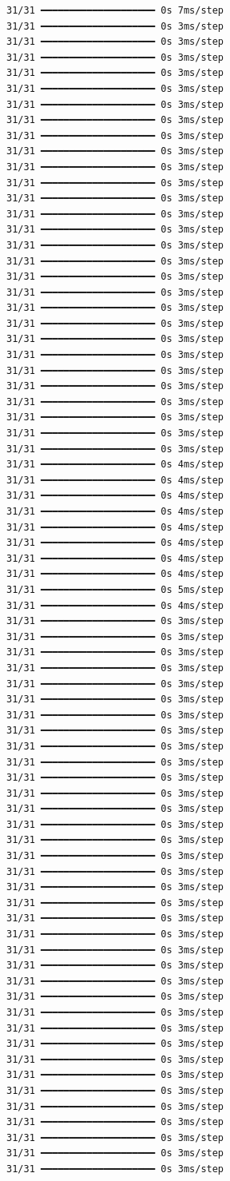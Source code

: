 \documentclass[
  letterpaper,
  DIV=11,
  numbers=noendperiod]{scrreprt}
\begin{document}
\begin{verbatim}
31/31 ━━━━━━━━━━━━━━━━━━━━ 0s 7ms/step
31/31 ━━━━━━━━━━━━━━━━━━━━ 0s 3ms/step
31/31 ━━━━━━━━━━━━━━━━━━━━ 0s 3ms/step
31/31 ━━━━━━━━━━━━━━━━━━━━ 0s 3ms/step
31/31 ━━━━━━━━━━━━━━━━━━━━ 0s 3ms/step
31/31 ━━━━━━━━━━━━━━━━━━━━ 0s 3ms/step
31/31 ━━━━━━━━━━━━━━━━━━━━ 0s 3ms/step
31/31 ━━━━━━━━━━━━━━━━━━━━ 0s 3ms/step
31/31 ━━━━━━━━━━━━━━━━━━━━ 0s 3ms/step
31/31 ━━━━━━━━━━━━━━━━━━━━ 0s 3ms/step
31/31 ━━━━━━━━━━━━━━━━━━━━ 0s 3ms/step
31/31 ━━━━━━━━━━━━━━━━━━━━ 0s 3ms/step
31/31 ━━━━━━━━━━━━━━━━━━━━ 0s 3ms/step
31/31 ━━━━━━━━━━━━━━━━━━━━ 0s 3ms/step
31/31 ━━━━━━━━━━━━━━━━━━━━ 0s 3ms/step
31/31 ━━━━━━━━━━━━━━━━━━━━ 0s 3ms/step
31/31 ━━━━━━━━━━━━━━━━━━━━ 0s 3ms/step
31/31 ━━━━━━━━━━━━━━━━━━━━ 0s 3ms/step
31/31 ━━━━━━━━━━━━━━━━━━━━ 0s 3ms/step
31/31 ━━━━━━━━━━━━━━━━━━━━ 0s 3ms/step
31/31 ━━━━━━━━━━━━━━━━━━━━ 0s 3ms/step
31/31 ━━━━━━━━━━━━━━━━━━━━ 0s 3ms/step
31/31 ━━━━━━━━━━━━━━━━━━━━ 0s 3ms/step
31/31 ━━━━━━━━━━━━━━━━━━━━ 0s 3ms/step
31/31 ━━━━━━━━━━━━━━━━━━━━ 0s 3ms/step
31/31 ━━━━━━━━━━━━━━━━━━━━ 0s 3ms/step
31/31 ━━━━━━━━━━━━━━━━━━━━ 0s 3ms/step
31/31 ━━━━━━━━━━━━━━━━━━━━ 0s 3ms/step
31/31 ━━━━━━━━━━━━━━━━━━━━ 0s 3ms/step
31/31 ━━━━━━━━━━━━━━━━━━━━ 0s 4ms/step
31/31 ━━━━━━━━━━━━━━━━━━━━ 0s 4ms/step
31/31 ━━━━━━━━━━━━━━━━━━━━ 0s 4ms/step
31/31 ━━━━━━━━━━━━━━━━━━━━ 0s 4ms/step
31/31 ━━━━━━━━━━━━━━━━━━━━ 0s 4ms/step
31/31 ━━━━━━━━━━━━━━━━━━━━ 0s 4ms/step
31/31 ━━━━━━━━━━━━━━━━━━━━ 0s 4ms/step
31/31 ━━━━━━━━━━━━━━━━━━━━ 0s 4ms/step
31/31 ━━━━━━━━━━━━━━━━━━━━ 0s 5ms/step
31/31 ━━━━━━━━━━━━━━━━━━━━ 0s 4ms/step
31/31 ━━━━━━━━━━━━━━━━━━━━ 0s 3ms/step
31/31 ━━━━━━━━━━━━━━━━━━━━ 0s 3ms/step
31/31 ━━━━━━━━━━━━━━━━━━━━ 0s 3ms/step
31/31 ━━━━━━━━━━━━━━━━━━━━ 0s 3ms/step
31/31 ━━━━━━━━━━━━━━━━━━━━ 0s 3ms/step
31/31 ━━━━━━━━━━━━━━━━━━━━ 0s 3ms/step
31/31 ━━━━━━━━━━━━━━━━━━━━ 0s 3ms/step
31/31 ━━━━━━━━━━━━━━━━━━━━ 0s 3ms/step
31/31 ━━━━━━━━━━━━━━━━━━━━ 0s 3ms/step
31/31 ━━━━━━━━━━━━━━━━━━━━ 0s 3ms/step
31/31 ━━━━━━━━━━━━━━━━━━━━ 0s 3ms/step
31/31 ━━━━━━━━━━━━━━━━━━━━ 0s 3ms/step
31/31 ━━━━━━━━━━━━━━━━━━━━ 0s 3ms/step
31/31 ━━━━━━━━━━━━━━━━━━━━ 0s 3ms/step
31/31 ━━━━━━━━━━━━━━━━━━━━ 0s 3ms/step
31/31 ━━━━━━━━━━━━━━━━━━━━ 0s 3ms/step
31/31 ━━━━━━━━━━━━━━━━━━━━ 0s 3ms/step
31/31 ━━━━━━━━━━━━━━━━━━━━ 0s 3ms/step
31/31 ━━━━━━━━━━━━━━━━━━━━ 0s 3ms/step
31/31 ━━━━━━━━━━━━━━━━━━━━ 0s 3ms/step
31/31 ━━━━━━━━━━━━━━━━━━━━ 0s 3ms/step
31/31 ━━━━━━━━━━━━━━━━━━━━ 0s 3ms/step
31/31 ━━━━━━━━━━━━━━━━━━━━ 0s 3ms/step
31/31 ━━━━━━━━━━━━━━━━━━━━ 0s 3ms/step
31/31 ━━━━━━━━━━━━━━━━━━━━ 0s 3ms/step
31/31 ━━━━━━━━━━━━━━━━━━━━ 0s 3ms/step
31/31 ━━━━━━━━━━━━━━━━━━━━ 0s 3ms/step
31/31 ━━━━━━━━━━━━━━━━━━━━ 0s 3ms/step
31/31 ━━━━━━━━━━━━━━━━━━━━ 0s 3ms/step
31/31 ━━━━━━━━━━━━━━━━━━━━ 0s 3ms/step
31/31 ━━━━━━━━━━━━━━━━━━━━ 0s 3ms/step
31/31 ━━━━━━━━━━━━━━━━━━━━ 0s 3ms/step
31/31 ━━━━━━━━━━━━━━━━━━━━ 0s 3ms/step
31/31 ━━━━━━━━━━━━━━━━━━━━ 0s 3ms/step
31/31 ━━━━━━━━━━━━━━━━━━━━ 0s 3ms/step
31/31 ━━━━━━━━━━━━━━━━━━━━ 0s 3ms/step


\end{verbatim}
\end{document}
